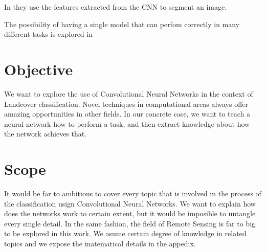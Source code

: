In \cite{DBLP:journals/corr/LongSD14} they use the features extracted from the CNN to segment an image.

The possibility of having a single model that can perfom correctly in many different tasks is explored in \cite{DBLP:journals/corr/KaiserGSVPJU17}

\section{Objective}

We want to explore the use of Convolutional Neural Networks in the context of Landcover classification. Novel techniques in computational areas always offer amazing opportunities in other fields. In our concrete case, we want to teach a neural network how to perform a task, and then extract knowledge about how the network achieves that.



\section{Scope}

It would be far to ambitious to cover every topic that is involved in the process of the classification usign Convolutional Neural Networks. We want to explain how does the networks work to certain extent, but it would be imposible to untangle every single detail. In the same fashion, the field of Remote Sensing is far to big to be explored in this work. We asume certain degree of knowledge in related topics and we expose the matematical details in the appedix.